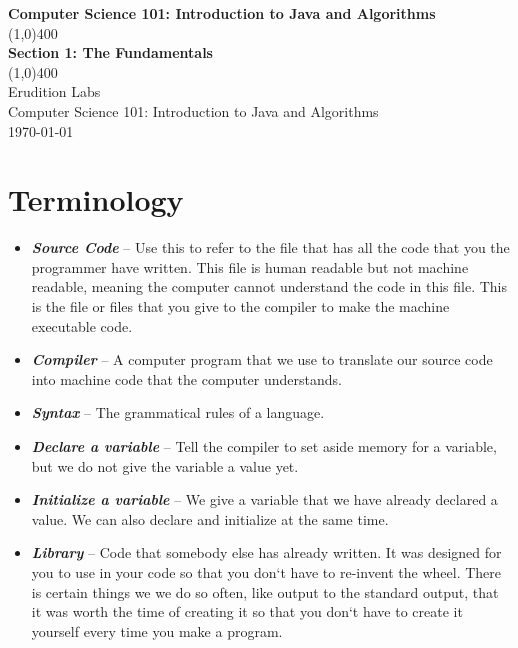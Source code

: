 \documentclass[11]{article}
\begin{document}
\begin{titlepage}
\begin{center}
\vspace{1cm}
\Large{\textbf{Computer Science 101: Introduction to Java and Algorithms}}\\
\vfill
\line(1,0){400}\\
\huge{\textbf{Section 1: The Fundamentals}}\\
\line(1,0){400}\\
\vfill
Erudition Labs\\
Computer Science 101: Introduction to Java and Algorithms\\
\today\\
\end{center}
\end{titlepage}

\tableofcontents
\thispagestyle{empty}
\clearpage
\setcounter{page}{1}

\section{Terminology}
\begin{itemize}
  \item \textbf{\textit{Source Code}} --
  Use this to refer to the file that has all the code that you the programmer have written. This file is human readable but not machine readable, meaning the computer cannot understand the code in this file. This is the file or files that you give to the compiler to make the machine executable code.

  \item \textbf{\textit{Compiler}} --
	A computer program that we use to translate our source code into machine code that the computer understands.
	
	  \item \textbf{\textit{Syntax}} --
	The grammatical rules of a language.
	
	 \item \textbf{\textit{Declare a variable}} --
	Tell the compiler to set aside memory for a variable, but we do not give the variable a value yet.
	
	  \item \textbf{\textit{Initialize a variable}} --
	We give a variable that we have already declared a value. We can also declare and initialize at the same time.
	
	  \item \textbf{\textit{Library}} --
	Code that somebody else has already written. It was designed for you to use in your code so that you don`t have to re-invent the wheel. There is certain things we we do so often, like output to the standard output, that it was worth the time of creating it so that you don`t have to create it yourself every time you make a program.
\end{itemize}
\end{document}
